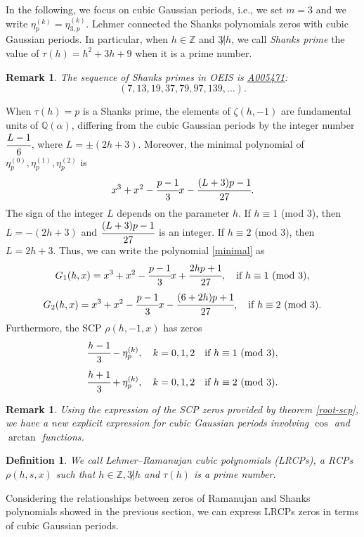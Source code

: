 \documentclass[12pt,reqno]{article}
\newtheorem{rem}[theorem]{Remark}
\newtheorem{defin}[theorem]{Definition}
\newenvironment{definition}{\begin{defin}\normalfont\quad}{\end{defin}}
\newcommand{\seqnum}[1]{\href{http://www.research.att.com/cgi-bin/access.cgi/as/~njas/sequences/eisA.cgi?Anum=#1}{\underline{#1}}}
\begin{document}
In the following, we focus on cubic Gaussian periods, i.e., we set $m=3$ and we write $\eta_p^{(k)}=\eta_{3,p}^{(k)}$. Lehmer \cite{Le} connected the Shanks polynomials zeros with cubic Gaussian periods. In particular, when $h\in\mathbb Z$ and $3\not|h$, we call \emph{Shanks prime} the value of $\tau(h)=h^2+3h+9$ when it is a prime number.
\begin{rem} The sequence of Shanks primes in OEIS \cite{oeis} is \seqnum{A005471}:
$$(7, 13, 19, 37, 79, 97, 139,\ldots).$$
\end{rem} 
When $\tau(h)=p$ is a Shanks prime, the elements of $\zeta(h,-1)$  are fundamental units of $\mathbb Q(\alpha)$, differing from the cubic Gaussian periods by the integer number $\cfrac{L-1}{6}$, where $L=\pm(2h+3)$. Moreover, the minimal polynomial of $\eta_p^{(0)},\eta_p^{(1)},\eta_p^{(2)}$ is
\begin{equation} \label{minimal} x^3+x^2-\cfrac{p-1}{3}x-\cfrac{(L+3)p-1}{27}. \end{equation}
The sign of the integer $L$ depends on the parameter $h$. If $h\equiv 1$ (mod $3$), then $L=-(2h+3)$ and $\cfrac{(L+3)p-1}{27}$ is an integer. If $h\equiv 2$ (mod $3$), then $L=2h+3$. Thus, we can write the polynomial \eqref{minimal} as
$$G_1(h,x)=x^3+x^2-\cfrac{p-1}{3}x+\cfrac{2hp+1}{27},\quad \text{if} \ h\equiv 1 \ (\text{mod}\ 3),$$
$$G_2(h,x)=x^3+x^2-\cfrac{p-1}{3}x-\cfrac{(6+2h)p+1}{27},\quad \text{if} \ h\equiv 2 \ (\text{mod}\ 3).$$
Furthermore, the SCP $\rho(h,-1,x)$ has zeros
\begin{equation} \label{p1}  \cfrac{h-1}{3}-\eta_p^{(k)},\quad k=0,1,2\quad \text{if} \ h\equiv 1 \ (\text{mod}\ 3), \end{equation}
\begin{equation} \label{p2} \cfrac{h+1}{3}+\eta_p^{(k)},\quad k=0,1,2\quad \text{if} \ h\equiv 2\ (\text{mod} \ 3). \end{equation}
\begin{rem}
Using the expression of the SCP zeros provided by theorem \ref{root-scp}, we have a new explicit expression for cubic Gaussian periods involving $\cos$ and $\arctan$ functions.
\end{rem}
\begin{definition}
We call \emph{Lehmer--Ramanujan cubic polynomials} (LRCPs), a RCPs $\rho(h,s,x)$ such that $h \in \mathbb{Z}, 3\not | h$ and $\tau(h)$ is a prime number.
\end{definition}
Considering the relationships between zeros of Ramanujan and Shanks polynomials showed in the previous section, we can express LRCPs zeros in terms of cubic Gaussian periods.
\end{document}
